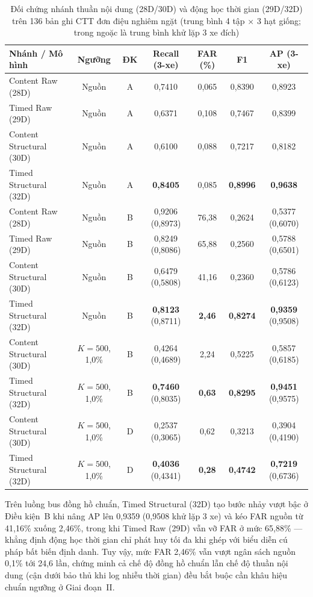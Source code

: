 \documentclass[12pt, a4paper, reqno, oneside]{book}
\begin{document}
\begin{table}[htbp]
  \centering
  \caption[Đối chứng nhánh thuần nội dung và động học thời gian trên 136 bản ghi đơn điệu]{Đối chứng nhánh thuần nội dung (28D/30D) và động học thời gian (29D/32D) trên 136 bản ghi CTT đơn điệu nghiêm ngặt (trung bình 4 tập $\times$ 3 hạt giống; trong ngoặc là trung bình khử lặp 3 xe đích)}
  \label{tab:timed-vs-content}
  \footnotesize
  \begin{tabular}{@{}l c c c c c c@{}}
    \toprule
    \textbf{Nhánh / Mô hình} & \textbf{Ngưỡng} & \textbf{ĐK} & \textbf{Recall (3-xe)} & \textbf{FAR (\%)} & \textbf{F1} & \textbf{AP (3-xe)} \\
    \midrule
    Content Raw (28D) & Nguồn & A & 0,7410 & 0,065 & 0,8390 & 0,8923 \\
    Timed Raw (29D) & Nguồn & A & 0,6371 & 0,108 & 0,7467 & 0,8399 \\
    Content Structural (30D) & Nguồn & A & 0,6100 & 0,088 & 0,7217 & 0,8182 \\
    Timed Structural (32D) & Nguồn & A & \textbf{0,8405} & 0,085 & \textbf{0,8996} & \textbf{0,9638} \\
    \midrule
    Content Raw (28D) & Nguồn & B & 0,9206 (0,8973) & 76,38 & 0,2624 & 0,5377 (0,6070) \\
    Timed Raw (29D) & Nguồn & B & 0,8249 (0,8086) & 65,88 & 0,2560 & 0,5788 (0,6501) \\
    Content Structural (30D) & Nguồn & B & 0,6479 (0,5808) & 41,16 & 0,2360 & 0,5786 (0,6123) \\
    Timed Structural (32D) & Nguồn & B & \textbf{0,8123} (0,8711) & \textbf{2,46} & \textbf{0,8274} & \textbf{0,9359} (0,9508) \\
    \midrule
    Content Structural (30D) & $K=500$, 1,0\% & B & 0,4264 (0,4689) & 2,24 & 0,5225 & 0,5857 (0,6185) \\
    Timed Structural (32D) & $K=500$, 1,0\% & B & \textbf{0,7460} (0,8035) & \textbf{0,63} & \textbf{0,8295} & \textbf{0,9451} (0,9575) \\
    Content Structural (30D) & $K=500$, 1,0\% & D & 0,2537 (0,3065) & 0,62 & 0,3213 & 0,3904 (0,4190) \\
    Timed Structural (32D) & $K=500$, 1,0\% & D & \textbf{0,4036} (0,4341) & \textbf{0,28} & \textbf{0,4742} & \textbf{0,7219} (0,6736) \\
    \bottomrule
  \end{tabular}
\end{table}

Trên luồng bus đồng hồ chuẩn, Timed Structural (32D) tạo bước nhảy vượt bậc ở Điều kiện~B khi nâng AP lên 0,9359 (0,9508 khử lặp 3 xe) và kéo FAR nguồn từ 41,16\% xuống 2,46\%, trong khi Timed Raw (29D) vẫn vỡ FAR ở mức 65,88\% — khẳng định động học thời gian chỉ phát huy tối đa khi ghép với biểu diễn cú pháp bất biến định danh. Tuy vậy, mức FAR 2,46\% vẫn vượt ngân sách nguồn 0,1\% tới 24,6 lần, chứng minh cả chế độ đồng hồ chuẩn lẫn chế độ thuần nội dung (cận dưới bảo thủ khi log nhiễu thời gian) đều bắt buộc cần khâu hiệu chuẩn ngưỡng ở Giai đoạn~II.
\end{document}
